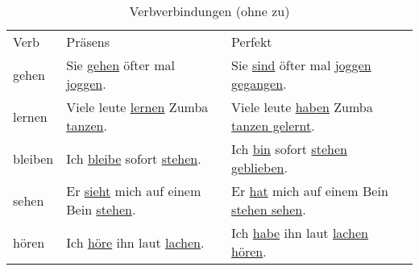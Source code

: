 \documentclass[12pt,a4paper]{report}
\newcommand{\satzew}[1]{\underline{#1}}
\begin{document}
\begin{longtable}{ l l l }
    \caption{Verbverbindungen (ohne zu)} \label{tab:long} \\
    Verb &
    Präsens &
    Perfekt \\
    gehen &
    Sie \satzew{gehen} öfter mal \satzew{joggen}. &
    Sie \satzew{sind} öfter mal \satzew{joggen gegangen}. \\
    lernen &
    Viele leute \satzew{lernen} Zumba \satzew{tanzen}. &
    Viele leute \satzew{haben} Zumba \satzew{tanzen gelernt}. \\
    bleiben &
    Ich \satzew{bleibe} sofort \satzew{stehen}. &
    Ich \satzew{bin} sofort \satzew{stehen geblieben}. \\
    sehen &
    Er \satzew{sieht} mich auf einem Bein \satzew{stehen}. &
    Er \satzew{hat} mich auf einem Bein \satzew{stehen sehen}. \\
    hören &
    Ich \satzew{höre} ihn laut \satzew{lachen}. &
    Ich \satzew{habe} ihn laut \satzew{lachen hören}. \\
\end{longtable}

\end{document}
